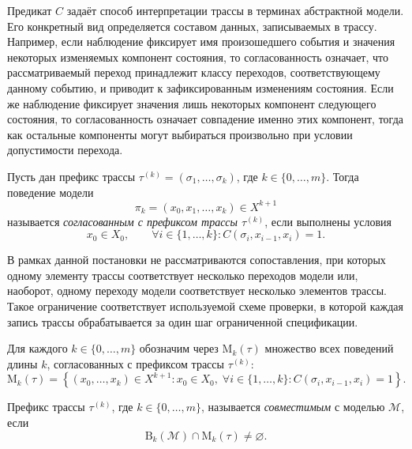 Предикат $C$ задаёт способ интерпретации трассы в терминах абстрактной модели.
Его конкретный вид определяется составом данных, записываемых в трассу.
Например, если наблюдение фиксирует имя произошедшего события и значения
некоторых изменяемых компонент состояния, то согласованность означает, что
рассматриваемый переход принадлежит классу переходов, соответствующему данному
событию, и приводит к зафиксированным изменениям состояния. Если же наблюдение
фиксирует значения лишь некоторых компонент следующего состояния, то
согласованность означает совпадение именно этих компонент, тогда как остальные
компоненты могут выбираться произвольно при условии допустимости перехода.

\begin{definition}
Пусть дан префикс трассы $\tau^{(k)} = (\sigma_1,\dots,\sigma_k)$, где
$k \in \{0,\dots,m\}$. Тогда поведение модели
\[
\pi_k = (x_0,x_1,\dots,x_k) \in X^{k+1}
\]
называется \emph{согласованным с префиксом трассы $\tau^{(k)}$}, если
выполнены условия
\[
x_0 \in X_0,
\qquad
\forall i \in \{1,\dots,k\} : C(\sigma_i,x_{i-1},x_i)=1.
\]
\end{definition}

В рамках данной постановки не рассматриваются сопоставления, при которых одному
элементу трассы соответствует несколько переходов модели или, наоборот, одному
переходу модели соответствует несколько элементов трассы. Такое ограничение
соответствует используемой схеме проверки, в которой каждая запись трассы
обрабатывается за один шаг ограниченной спецификации.

\begin{definition}\label{def:M_k}
Для каждого $k \in \{0,\dots,m\}$ обозначим через $\mathrm{M}_k(\tau)$
множество всех поведений длины $k$, согласованных с префиксом трассы
$\tau^{(k)}$:
\begin{equation}\label{f8}
\mathrm{M}_k(\tau)
=
\left\{
(x_0,\dots,x_k) \in X^{k+1}
:
x_0 \in X_0,\;
\forall i \in \{1,\dots,k\} : C(\sigma_i,x_{i-1},x_i)=1
\right\}.
\end{equation}
\end{definition}

\begin{definition}
Префикс трассы $\tau^{(k)}$, где $k \in \{0,\dots,m\}$, называется
\emph{совместимым} с моделью $\mathcal{M}$, если
\begin{equation}\label{f8a}
\mathrm{B}_k(\mathcal{M}) \cap \mathrm{M}_k(\tau) \neq \varnothing.
\end{equation}
\end{definition}

